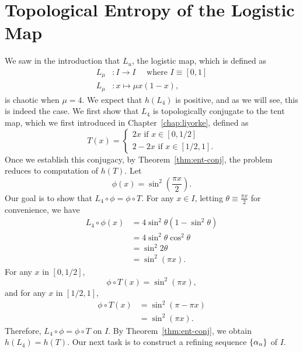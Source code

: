 \documentclass[10pt,twoside,draft]{book}
\begin{document}
\section{Topological Entropy of the Logistic Map}
We saw in the introduction that $L_u$, the logistic map, which is defined as
\begin{align*}
  L_\mu&: I \to I \quad\mbox{ where } I \equiv [0,1] \\
  L_\mu&: x \mapsto \mu x (1-x),
\end{align*}
is chaotic when $\mu = 4$.
We expect that $h(L_4)$ is positive, and as we will see, this is indeed the case. 
We first show that $L_4$ is topologically conjugate to the tent map, which we first introduced in Chapter~\ref{chap:liyorke}, defined as
\begin{equation*}
  T(x) = 
  \begin{cases}
    2x \mbox{ if } x \in [0,1/2] \\
    2 - 2x \mbox{ if } x \in [1/2,1].
  \end{cases}
\end{equation*}
Once we establish this conjugacy, by Theorem~\ref{thm:ent-conj}, the problem reduces to computation of $h(T)$.
Let
\begin{equation*}
  \phi(x) = \sin^2(\frac{\pi x}{2}).
\end{equation*}
Our goal is to show that $L_4 \circ \phi = \phi \circ T$.
For any $x \in I$, letting $\theta \equiv \frac{\pi x}{2}$ for convenience, we have
\begin{align*}
  L_4 \circ \phi(x)
  &= 4\sin^2\theta(1 - \sin^2\theta) \\
  &= 4\sin^2\theta \cos^2\theta \\
  &= \sin^2 2\theta \\
  &= \sin^2 (\pi x).
\end{align*}
For any $x$ in $[0,1/2]$,
\begin{equation*}
  \phi \circ T(x)
  = \sin^2(\pi x),
\end{equation*}
and for any $x$ in $[1/2,1]$,
\begin{align*}
  \phi \circ T(x)
  &= \sin^2(\pi - \pi x) \\
  &= \sin^2(\pi x).
\end{align*}
Therefore, $L_4 \circ \phi = \phi \circ T$ on $I$.
By Theorem~\ref{thm:ent-conj}, we obtain $h(L_4) = h(T)$.
Our next task is to construct a refining sequence $\left \{ \alpha_n \right \}$ of $I$.
\end{document}
